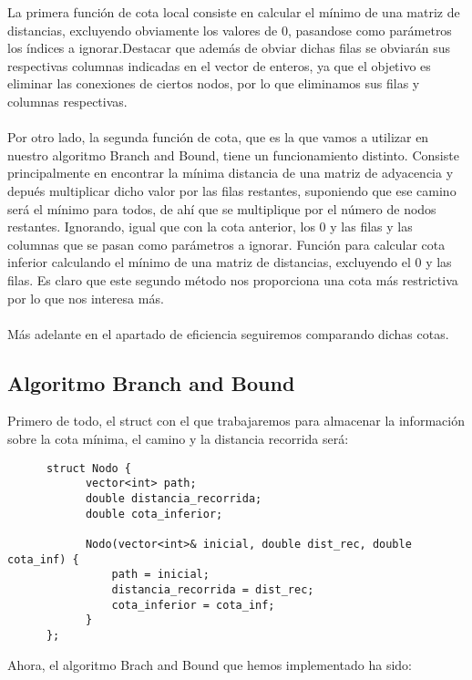 \documentclass[11pt,openany]{book}
\begin{document}
La primera función de cota local consiste en calcular el mínimo de una matriz de distancias, excluyendo obviamente los valores
de 0, pasandose como parámetros los índices a ignorar.Destacar que además de obviar dichas filas se obviarán sus respectivas 
columnas indicadas en el vector de enteros, ya que el objetivo es eliminar las conexiones de ciertos nodos, por lo que 
eliminamos sus filas y columnas respectivas.
\\ \\
Por otro lado, la segunda función de cota, que es la que vamos a utilizar en nuestro algoritmo Branch and Bound, tiene un funcionamiento 
distinto. Consiste principalmente en encontrar la mínima distancia de una matriz de adyacencia y depués multiplicar dicho valor por
las filas restantes, suponiendo que ese camino será el mínimo para todos, de ahí que se multiplique por el número de nodos restantes.
Ignorando, igual que con la cota anterior, los 0 y las filas y las columnas que se pasan como parámetros a ignorar. Función para calcular 
cota inferior calculando el mínimo de una matriz de distancias, excluyendo el 0 y las filas. Es claro que este segundo método nos proporciona 
una cota más restrictiva por lo que nos interesa más.
\\ \\
Más adelante en el apartado de eficiencia seguiremos comparando dichas cotas.

\subsection{Algoritmo Branch and Bound}
Primero de todo, el struct con el que trabajaremos para almacenar la información sobre la cota mínima, el camino y la distancia recorrida será:

\begin{lstlisting}
      struct Nodo {
            vector<int> path;
            double distancia_recorrida; 
            double cota_inferior; 
        
            Nodo(vector<int>& inicial, double dist_rec, double cota_inf) {
                path = inicial;
                distancia_recorrida = dist_rec;
                cota_inferior = cota_inf;
            }
      };
\end{lstlisting}

Ahora, el algoritmo Brach and Bound que hemos implementado ha sido:
\end{document}
